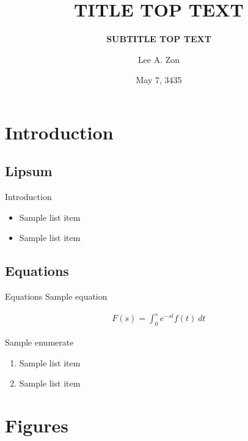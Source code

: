 \documentclass[usenames,dvipsnames]{beamer}
\title[TITLE BOTTOM TEXT] %
{
      \textbf{TITLE TOP TEXT}
}
\subtitle[SUBTITLE BOTTOM TEXT]
{
      \textbf{SUBTITLE TOP TEXT}
}
\author[(AUTHOR BOTTOM TEXT)] %
{
      Lee A. Zon
}
\institute[Colorado State University]
{
      Colorado State University
}
\date{May 7, 3435}
\begin{document}
{
\begin{frame}
  \titlepage
\end{frame}
}

\section{Introduction}
\subsection{Lipsum}
\begin{frame}{Introduction}
  \lipsum[1]

  \begin{itemize}
    \item Sample list item
    \item Sample list item
  \end{itemize}
\end{frame}

\subsection{Equations}
\begin{frame}{Equations}
  Sample equation

  \begin{align}
    F(s) = \int_0^s e^{-st} f(t) \ dt
  \end{align}
  
  Sample enumerate
  \begin{enumerate}
    \item Sample list item
    \item Sample list item
  \end{enumerate}
\end{frame}

\section{Figures}
\end{document}
